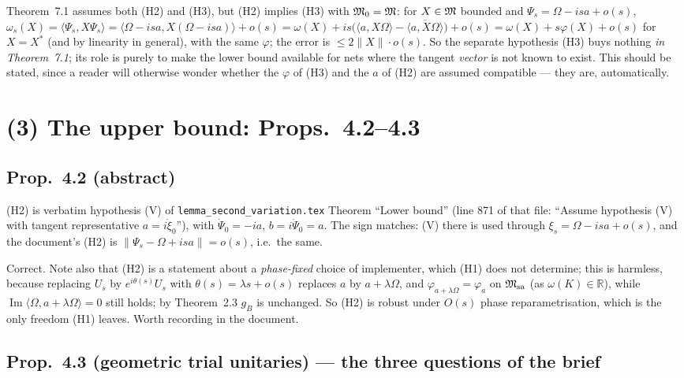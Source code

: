 \documentclass[11pt]{article}
\newcommand{\ip}[2]{\langle#1,#2\rangle}
\newcommand{\norm}[1]{\lVert#1\rVert}
\newcommand{\Msa}{\cM_{\mathrm{sa}}}
\newcommand{\gB}{g_B}
\newcommand{\Om}{\Omega}
\begin{document}
\begin{remark}\label{r:H2impliesH3}
Theorem~7.1 assumes both (H2) and (H3), but (H2) implies (H3) with $\mathfrak M_0=\mathfrak M$:
for $X\in\mathfrak M$ bounded and $\Psi_s=\Om-isa+o(s)$,
$\omega_s(X)=\ip{\Psi_s}{X\Psi_s}=\ip{\Om-isa}{X(\Om-isa)}+o(s)
=\omega(X)+is\bigl(\ip a{X\Om}-\overline{\ip a{X\Om}}\bigr)+o(s)=\omega(X)+s\varphi(X)+o(s)$
for $X=X^*$ (and by linearity in general), with the same $\varphi$; the error is
$\le2\norm X\cdot o(s)$.  So the separate hypothesis (H3) buys nothing \emph{in Theorem~7.1}; its role is
purely to make the lower bound available for nets where the tangent \emph{vector} is not known to exist.
This should be stated, since a reader will otherwise wonder whether the $\varphi$ of (H3) and the $a$ of
(H2) are assumed compatible --- they are, automatically.
\end{remark}


\section{(3) The upper bound: Props.\ 4.2--4.3}\label{r:upper}

\subsection{Prop.\ 4.2 (abstract)}
(H2) is verbatim hypothesis (V) of \texttt{lemma\_second\_variation.tex} Theorem ``Lower bound''
(line 871 of that file: ``Assume hypothesis (V) with tangent representative $a=i\dot\xi_0$''), with
$\dot\Psi_0=-ia$, $b=i\dot\Psi_0=a$.  The sign matches: (V) there is used through
$\xi_s=\Om-isa+o(s)$, and the document's (H2) is $\norm{\Psi_s-\Om+isa}=o(s)$, i.e.\ the same.
\begin{verdictok}
Correct.  Note also that (H2) is a statement about a \emph{phase-fixed} choice of implementer, which (H1)
does not determine; this is harmless, because replacing $U_s$ by $e^{i\theta(s)}U_s$ with
$\theta(s)=\lambda s+o(s)$ replaces $a$ by $a+\lambda\Om$, and $\varphi_{a+\lambda\Om}=\varphi_a$ on $\Msa$
(as $\omega(K)\in\mathbb R$), while $\operatorname{Im}\ip\Om{a+\lambda\Om}=0$ still holds; by Theorem~2.3
$\gB$ is unchanged.  So (H2) is robust under $O(s)$ phase reparametrisation, which is the only freedom (H1)
leaves.  Worth recording in the document.
\end{verdictok}

\subsection{Prop.\ 4.3 (geometric trial unitaries) --- the three questions of the brief}
\end{document}
